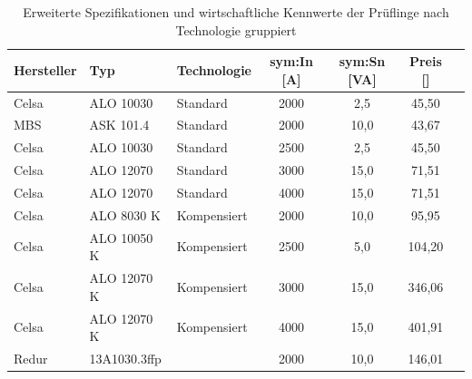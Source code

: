 \begin{table}[H]
    \centering
    \caption{Erweiterte Spezifikationen und wirtschaftliche Kennwerte der Prüflinge nach Technologie gruppiert}
    \label{tab:wandler_spezifikationen_erweitert}
    \small
    \begin{tabular}{@{}lll S[table-format=4.0] S[table-format=2.1] S[table-format=4.2] S[table-format=3.2]@{}}
        \toprule
        \textbf{Hersteller} & \textbf{Typ} & \textbf{Technologie} & {\textbf{\gls{sym:In} [\unit{A}]}} & {\textbf{\gls{sym:Sn} [\unit{VA}]}} & {\textbf{Preis [\text{\euro}]}} \\
        \midrule
        Celsa               & ALO 10030    & Standard             & 2000                               & 2,5                                 & 45,50                           \\
        MBS                 & ASK 101.4    & Standard             & 2000                               & 10,0                                & 43,67                           \\
        Celsa               & ALO 10030    & Standard             & 2500                               & 2,5                                 & 45,50                           \\
        Celsa               & ALO 12070    & Standard             & 3000                               & 15,0                                & 71,51                           \\
        Celsa               & ALO 12070    & Standard             & 4000                               & 15,0                                & 71,51                           \\
        \addlinespace
        Celsa               & ALO 8030 K   & Kompensiert          & 2000                               & 10,0                                & 95,95                           \\
        Celsa               & ALO 10050 K  & Kompensiert          & 2500                               & 5,0                                 & 104,20                          \\
        Celsa               & ALO 12070 K  & Kompensiert          & 3000                               & 15,0                                & 346,06                          \\
        Celsa               & ALO 12070 K  & Kompensiert          & 4000                               & 15,0                                & 401,91                          \\
        \addlinespace
        Redur               & 13A1030.3ffp &   & 2000                               & 10,0                                & 146,01                          \\
        \bottomrule
    \end{tabular}
\end{table}

